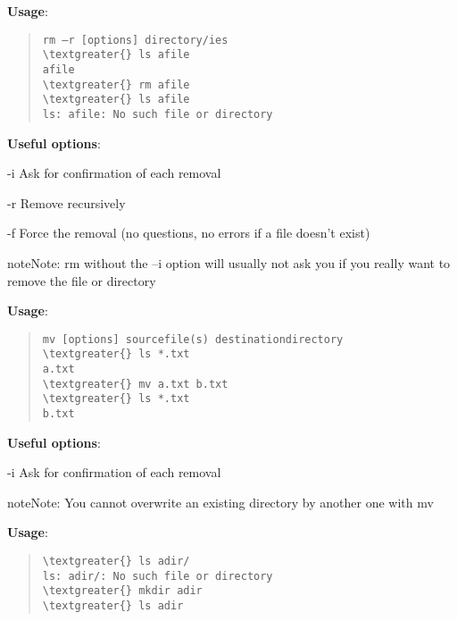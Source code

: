 \documentclass[letterpaper,10pt,english]{sphinxmanual}
\begin{document}
\textbf{Usage}:  
\begin{quote}

\begin{Verbatim}[commandchars=\\\{\}]
rm –r [options] directory/ies
\textgreater{} ls afile
afile
\textgreater{} rm afile
\textgreater{} ls afile
ls: afile: No such file or directory
\end{Verbatim}
\end{quote}

\textbf{Useful options}:
\begin{optionlist}{3cm}
\item [-i]  
Ask for confirmation of each removal
\item [-r]  
Remove recursively
\item [-f]  
Force the removal (no questions, no errors if a file doesn't exist)
\end{optionlist}

\begin{notice}{note}{Note:}
rm without the –i option will usually not ask you if you really want to remove the file or directory
\end{notice}

\textbf{Usage}:  
\begin{quote}

\begin{Verbatim}[commandchars=\\\{\}]
mv [options] sourcefile(s) destinationdirectory
\textgreater{} ls *.txt
a.txt
\textgreater{} mv a.txt b.txt
\textgreater{} ls *.txt
b.txt
\end{Verbatim}
\end{quote}

\textbf{Useful options}:
\begin{optionlist}{3cm}
\item [-i]  
Ask for confirmation of each removal
\end{optionlist}

\begin{notice}{note}{Note:}
You cannot overwrite an existing directory by another one with mv
\end{notice}

\textbf{Usage}:  
\begin{quote}

\begin{Verbatim}[commandchars=\\\{\}]
\textgreater{} ls adir/
ls: adir/: No such file or directory
\textgreater{} mkdir adir
\textgreater{} ls adir
\end{Verbatim}
\end{quote}
\end{document}
